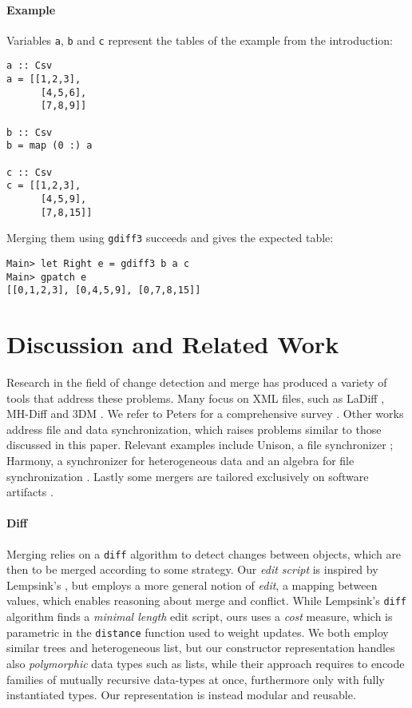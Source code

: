 \documentclass{sigplanconf}
\theoremstyle{plain}
\begin{document}
\paragraph{Example}
Variables \texttt{a}, \texttt{b} and \texttt{c} represent the tables
of the example from the introduction:
\begin{verbatim}
a :: Csv
a = [[1,2,3],
      [4,5,6],
      [7,8,9]]

b :: Csv
b = map (0 :) a

c :: Csv
c = [[1,2,3],
      [4,5,9],
      [7,8,15]]
\end{verbatim}
Merging them using \texttt{gdiff3} succeeds and gives the expected table:
\begin{verbatim}
Main> let Right e = gdiff3 b a c
Main> gpatch e
[[0,1,2,3], [0,4,5,9], [0,7,8,15]]
\end{verbatim}




\section{Discussion and Related Work}
\label{sec:related-work}
Research in the field of change detection and merge has produced a
variety of tools that address these problems.  Many focus on XML
files, such as LaDiff \cite{Chawathe96}, MH-Diff \cite{Chawathe97} and
3DM \cite{Lind01, Lind04, Lind05}.  We refer to Peters for a
comprehensive survey \cite{PetersSurvey}.
%
Other works address file and data synchronization, which raises
problems similar to those discussed in this paper. Relevant examples
include Unison, a file synchronizer \cite{Pierce98, UnisonSpec};
Harmony, a synchronizer for heterogeneous data
\cite{HarmonyOverview,Pierce07} and an algebra for file
synchronization \cite{Ramsey01}.
%
Lastly some mergers are tailored exclusively on software artifacts
\cite{Westfechtel91, Mens02, Apel11}. 

\paragraph{Diff}
Merging relies on a \texttt{diff} algorithm to detect changes between
objects, which are then to be merged according to some strategy.
%
Our \emph{edit script} is inspired by Lempsink's \cite{Lemp09}, but
employs a more general notion of \emph{edit}, a mapping between
values, which enables reasoning about merge and conflict.
%
While Lempsink's \texttt{diff} algorithm finds a \emph{minimal length}
edit script, ours uses a \emph{cost} measure, which is parametric in
the \texttt{distance} function used to weight updates.  
%
We both employ similar trees and heterogeneous list, but our
constructor representation handles also \emph{polymorphic}
data types such as lists, while their approach requires 
to encode families of mutually recursive data-types
at once, furthermore only with fully instantiated types.
Our representation is instead modular and reusable.
\end{document}
